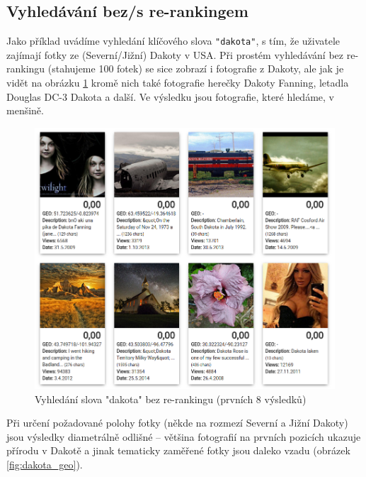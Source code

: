 \documentclass[12pt,oneside,a4paper]{article}
\begin{document}
\subsection{Vyhledávání bez/s re-rankingem}
Jako příklad uvádíme vyhledání klíčového slova \texttt{"dakota"}, s tím, že uživatele zajímají fotky ze (Severní/Jižní) Dakoty v USA. Při prostém vyhledávání bez re-rankingu (stahujeme 100 fotek) se sice zobrazí i fotografie z Dakoty, ale jak je vidět na obrázku \ref{fig:dakota_no_geo} kromě nich také fotografie herečky Dakoty Fanning, letadla Douglas DC-3 Dakota a další. Ve výsledku jsou fotografie, které hledáme, v menšině.



\begin{figure}[H] \begin{center}
\includegraphics[width=13.5cm]{pics/dakota_no_geo.png} \caption{Vyhledání slova "dakota" bez re-rankingu (prvních 8 výsledků)}
\label{fig:dakota_no_geo}
\end{center} \end{figure}

Při určení požadované polohy fotky (někde na rozmezí Severní a Jižní Dakoty) jsou výsledky diametrálně odlišné -- většina fotografií na prvních pozicích ukazuje přírodu v Dakotě a jinak tematicky zaměřené fotky jsou daleko vzadu (obrázek \ref{fig:dakota_geo}).
\end{document}
